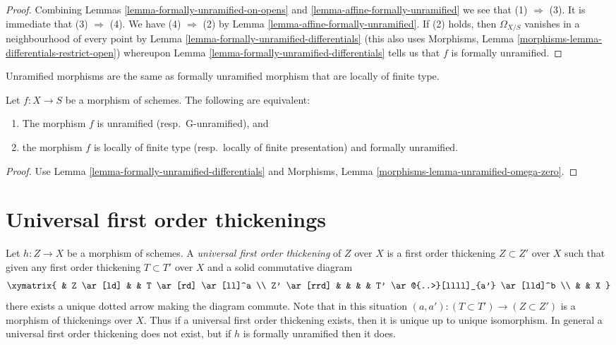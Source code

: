 \begin{proof}
Combining Lemmas \ref{lemma-formally-unramified-on-opens} and
\ref{lemma-affine-formally-unramified} we see that (1) $\Rightarrow$ (3).
It is immediate that (3) $\Rightarrow$ (4).
We have (4) $\Rightarrow$ (2) by Lemma \ref{lemma-affine-formally-unramified}.
If (2) holds, then $\Omega_{X/S}$ vanishes in a neighbourhood
of every point by Lemma \ref{lemma-formally-unramified-differentials}
(this also uses Morphisms, Lemma
\ref{morphisms-lemma-differentials-restrict-open}) whereupon
Lemma \ref{lemma-formally-unramified-differentials} tells us that $f$
is formally unramified.
\end{proof}

\begin{lemma}
\label{lemma-unramified-formally-unramified}
\begin{slogan}
Unramified morphisms are the same as formally unramified morphism that
are locally of finite type.
\end{slogan}
Let $f : X \to S$ be a morphism of schemes.
The following are equivalent:
\begin{enumerate}
\item The morphism $f$ is unramified (resp.\ G-unramified), and
\item the morphism $f$ is locally of finite type (resp.\ locally of finite
presentation) and formally unramified.
\end{enumerate}
\end{lemma}

\begin{proof}
Use Lemma \ref{lemma-formally-unramified-differentials} and
Morphisms, Lemma \ref{morphisms-lemma-unramified-omega-zero}.
\end{proof}









\section{Universal first order thickenings}
\label{section-universal-thickening}

\noindent
Let $h : Z \to X$ be a morphism of schemes. A {\it universal first order
thickening} of $Z$ over $X$ is a first order thickening $Z \subset Z'$
over $X$ such that given any first order thickening $T \subset T'$
over $X$ and a solid commutative diagram
$$
\xymatrix{
& Z \ar[ld] & & T \ar[rd] \ar[ll]^a \\
Z' \ar[rrd] & & & & T' \ar@{..>}[llll]_{a'} \ar[lld]^b \\
 & & X
}
$$
there exists a unique dotted arrow making the diagram commute.
Note that in this situation $(a, a') : (T \subset T') \to (Z \subset Z')$
is a morphism of thickenings over $X$. Thus if a universal first order
thickening exists, then it is unique up to unique isomorphism.
In general a universal first order thickening
does not exist, but if $h$ is formally unramified then it does.

